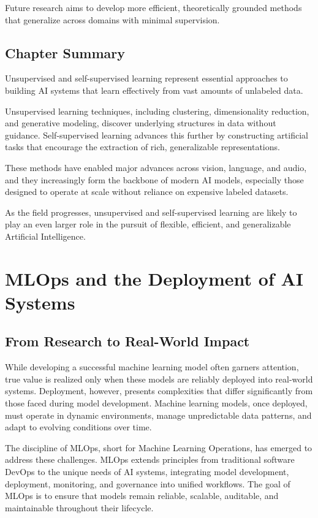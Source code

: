\documentclass[openany]{book}
\begin{document}
Future research aims to develop more efficient, theoretically grounded methods 
that generalize across domains with minimal supervision.

\section{Chapter Summary}
Unsupervised and self-supervised learning represent essential approaches to 
building AI systems that learn effectively from vast amounts of unlabeled data.

Unsupervised learning techniques, including clustering, dimensionality 
reduction, and generative modeling, discover underlying structures in data 
without guidance. Self-supervised learning advances this further by constructing 
artificial tasks that encourage the extraction of rich, generalizable 
representations.

These methods have enabled major advances across vision, language, and audio, 
and they increasingly form the backbone of modern AI models, especially those 
designed to operate at scale without reliance on expensive labeled datasets.

As the field progresses, unsupervised and self-supervised learning are likely to 
play an even larger role in the pursuit of flexible, efficient, and 
generalizable Artificial Intelligence.

\chapter{MLOps and the Deployment of AI Systems}

\section{From Research to Real-World Impact}

While developing a successful machine learning model often garners attention, 
true value is realized only when these models are reliably deployed into 
real-world systems. Deployment, however, presents complexities that differ 
significantly from those faced during model development. Machine learning 
models, once deployed, must operate in dynamic environments, manage 
unpredictable data patterns, and adapt to evolving conditions over time.

The discipline of MLOps, short for Machine Learning Operations, has emerged to 
address these challenges. MLOps extends principles from traditional software 
DevOps to the unique needs of AI systems, integrating model development, 
deployment, monitoring, and governance into unified workflows. The goal of 
MLOps is to ensure that models remain reliable, scalable, auditable, and 
maintainable throughout their lifecycle.
\end{document}
